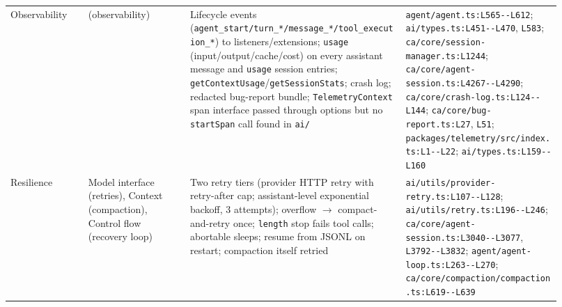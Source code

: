 \begin{longtable}{@{}p{0.13\linewidth}p{0.17\linewidth}p{0.36\linewidth}p{0.26\linewidth}@{}}
Observability & (observability) & Lifecycle events (\texttt{agent\_\allowbreak{}start/\allowbreak{}turn\_\allowbreak{}*/\allowbreak{}message\_\allowbreak{}*/\allowbreak{}tool\_\allowbreak{}execution\_\allowbreak{}*}) to listeners/extensions; \texttt{usage} (input/output/cache/cost) on every assistant message and \texttt{usage} session entries; \texttt{getContextUsage}/\texttt{getSessionStats}; crash log; redacted bug-report bundle; \texttt{TelemetryContext} span interface passed through options but no \texttt{startSpan} call found in \texttt{ai/\allowbreak{}} & \texttt{agent/\allowbreak{}agent.\allowbreak{}ts:\allowbreak{}L565-\allowbreak{}-\allowbreak{}L612}; \texttt{ai/\allowbreak{}types.\allowbreak{}ts:\allowbreak{}L451-\allowbreak{}-\allowbreak{}L470}, \texttt{L583}; \texttt{ca/\allowbreak{}core/\allowbreak{}session-\allowbreak{}manager.\allowbreak{}ts:\allowbreak{}L1244}; \texttt{ca/\allowbreak{}core/\allowbreak{}agent-\allowbreak{}session.\allowbreak{}ts:\allowbreak{}L4267-\allowbreak{}-\allowbreak{}L4290}; \texttt{ca/\allowbreak{}core/\allowbreak{}crash-\allowbreak{}log.\allowbreak{}ts:\allowbreak{}L124-\allowbreak{}-\allowbreak{}L144}; \texttt{ca/\allowbreak{}core/\allowbreak{}bug-\allowbreak{}report.\allowbreak{}ts:\allowbreak{}L27}, \texttt{L51}; \texttt{packages/\allowbreak{}telemetry/\allowbreak{}src/\allowbreak{}index.\allowbreak{}ts:\allowbreak{}L1-\allowbreak{}-\allowbreak{}L22}; \texttt{ai/\allowbreak{}types.\allowbreak{}ts:\allowbreak{}L159-\allowbreak{}-\allowbreak{}L160} \\
Resilience & Model interface (retries), Context (compaction), Control flow (recovery loop) & Two retry tiers (provider HTTP retry with retry-after cap; assistant-level exponential backoff, 3 attempts); overflow $\rightarrow$ compact-and-retry once; \texttt{length} stop fails tool calls; abortable sleeps; resume from JSONL on restart; compaction itself retried & \texttt{ai/\allowbreak{}utils/\allowbreak{}provider-\allowbreak{}retry.\allowbreak{}ts:\allowbreak{}L107-\allowbreak{}-\allowbreak{}L128}; \texttt{ai/\allowbreak{}utils/\allowbreak{}retry.\allowbreak{}ts:\allowbreak{}L196-\allowbreak{}-\allowbreak{}L246}; \texttt{ca/\allowbreak{}core/\allowbreak{}agent-\allowbreak{}session.\allowbreak{}ts:\allowbreak{}L3040-\allowbreak{}-\allowbreak{}L3077}, \texttt{L3792-\allowbreak{}-\allowbreak{}L3832}; \texttt{agent/\allowbreak{}agent-\allowbreak{}loop.\allowbreak{}ts:\allowbreak{}L263-\allowbreak{}-\allowbreak{}L270}; \texttt{ca/\allowbreak{}core/\allowbreak{}compaction/\allowbreak{}compaction.\allowbreak{}ts:\allowbreak{}L619-\allowbreak{}-\allowbreak{}L639} \\

\end{longtable}
